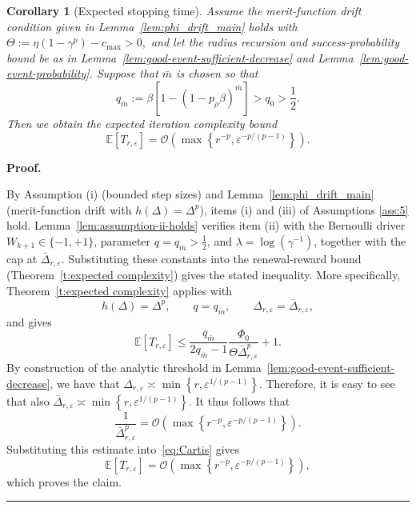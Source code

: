 \documentclass[11pt,a4paper]{article}
\newtheorem{corollary}{Corollary}[section]
\newenvironment{proof}[1][Proof]{%
  \par\noindent\textbf{#1.}\ %
}{%
  \par\vspace{-0.5 ex}            %
  \noindent\hfill\rule{0.5em}{0.5em}\par
  \vspace{1ex}
}
\newcommand{\Dexp}{p}
\newcommand{\goldelta}{r}
\begin{document}
\begin{corollary}[Expected stopping time]
\label{cor:expected-stopping}
Assume the merit-function drift condition given in  Lemma~\ref{lem:phi_drift_main}
holds with $\Theta:=\eta(1-\gamma^{\Dexp})-c_{\max}>0,$
and let the radius recursion and success-probability bound be as in
Lemma~\ref{lem:good-event-sufficient-decrease} and Lemma~\ref{lem:good-event-probability}. Suppose that \(\bar{m}\) is chosen so that
\[
    q_{\bar{m}}
    :=
    \beta\left[1-(1-p_\rho\beta)^{\bar{m}}\right]
    > q_0>
    \frac12 .
\]
Then we obtain the expected iteration complexity bound
\[
    \mathbb E[T_{\goldelta,\varepsilon}]
    =
    \mathcal O\left(
        \max\left\{
            \goldelta^{-\Dexp},
            \varepsilon^{-\Dexp/(\Dexp-1)}
        \right\}
    \right).
\]






\end{corollary}
\begin{proof}
By Assumption (i) (bounded step sizes) and Lemma~\ref{lem:phi_drift_main} (merit-function drift with $h(\Delta)=\Delta^{\Dexp}$), items (i) and (iii) of Assumptions \ref{ass:5} hold. Lemma~\ref{lem:assumption-ii-holds} verifies item (ii) with the Bernoulli driver $W_{k+1}\in\{-1,+1\}$, parameter $q=q_{\bar{m}}>\tfrac12$, and $\lambda=\log(\gamma^{-1})$, together with the cap at $\bar{\Delta}_{\goldelta, \varepsilon}$. Substituting these constants into the renewal-reward bound (Theorem~\ref{t:expected complexity}) gives the stated inequality. More specifically, Theorem~\ref{t:expected complexity} applies with
\[
    h(\Delta)=\Delta^{\Dexp},
    \qquad
    q=q_{\bar{m}},
    \qquad
    \Delta_{\goldelta,\varepsilon}
    =
    \bar\Delta_{\goldelta,\varepsilon},
\]
and gives
\begin{equation}\label{eq:Cartis}
    \mathbb E[T_{\goldelta,\varepsilon}]
    \le
    \frac{q_{\bar{m}}}{2q_{\bar{m}}-1}
    \frac{\Phi_0}{\Theta\bar\Delta_{\goldelta,\varepsilon}^{\Dexp}}
    +1 .
\end{equation}
By construction of the analytic threshold in Lemma~\ref{lem:good-event-sufficient-decrease}, we have that $\Delta_{\goldelta,\varepsilon}
    \asymp
    \min\left\{
        \goldelta,
        \varepsilon^{1/(\Dexp-1)}
    \right\}.$ 
Therefore, it is easy to see that also
$ \bar\Delta_{\goldelta,\varepsilon}
    \asymp
    \min\left\{
        \goldelta,
        \varepsilon^{1/(\Dexp-1)}
    \right\}.$
It thus follows that
\[
    \frac{1}{\bar\Delta_{\goldelta,\varepsilon}^{\Dexp}}
    =
    \mathcal O\left(
        \max\left\{
            \goldelta^{-\Dexp},
            \varepsilon^{-\Dexp/(\Dexp-1)}
        \right\}
    \right).
\]
Substituting this estimate into~\eqref{eq:Cartis} gives
\[
    \mathbb E[T_{\goldelta,\varepsilon}]
    =
    \mathcal O\left(
        \max\left\{
            \goldelta^{-\Dexp},
            \varepsilon^{-\Dexp/(\Dexp-1)}
        \right\}
    \right),
\]
which proves the claim.



\end{proof}
\end{document}
